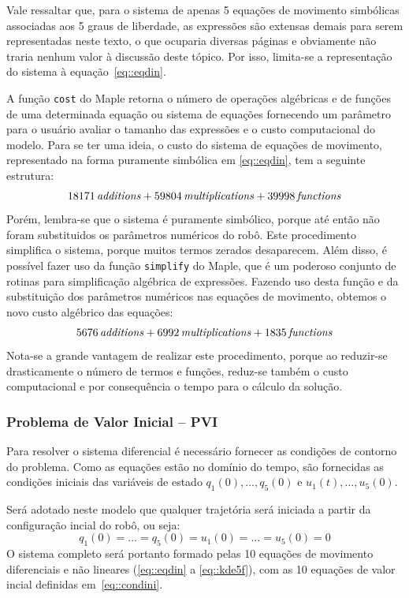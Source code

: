 Vale ressaltar que, para o sistema de apenas 5 equações de movimento simbólicas
associadas aos 5 graus de liberdade, as expressões são extensas demais para
serem representadas neste texto, o que ocuparia diversas páginas e obviamente
não traria nenhum valor à discussão deste tópico. Por isso, limita-se a
representação do sistema à equação~\ref{eq::eqdin}.

A função \texttt{cost} do Maple retorna o número de operações algébricas e de
funções de uma determinada equação ou sistema de equações fornecendo um
parâmetro para o usuário avaliar o tamanho das expressões e o custo
computacional do modelo.
Para se ter uma ideia, o custo do sistema de equações de movimento, representado
na forma puramente simbólica em \ref{eq::eqdin}, tem  a seguinte estrutura:
%
	$$ 18171\,{\it additions}+59804\,{\it multiplications}+39998\,{\it 
functions} $$
%
Porém, lembra-se que o sistema é puramente simbólico, porque até então não foram
substituidos os parâmetros numéricos do robô.
Este procedimento simplifica o sistema, porque muitos termos zerados
desaparecem.
Além disso, é possível fazer uso da função \texttt{simplify} do Maple, que é um
poderoso conjunto de rotinas para simplificação algébrica de expressões. Fazendo
uso desta função e da substituição dos parâmetros numéricos nas equações de
movimento, obtemos o novo custo algébrico das equações:
%
	$$ 5676\,{\it additions}+6992\,{\it multiplications}+1835\,{\it functions} $$
%
Nota-se a grande vantagem de realizar este procedimento, porque ao reduzir-se
drasticamente o número de termos e funções, reduz-se também o custo
computacional e por consequência o tempo para o cálculo da solução.

\subsubsection{Problema de Valor Inicial -- PVI}

Para resolver o sistema diferencial é necessário fornecer as condições de
contorno do problema. Como as equações estão no domínio do tempo, são fornecidas
as condições iniciais das variáveis de estado $q_{1}(0),\ldots, q_{5}(0)$ e
$u_{1}(t),\ldots, u_{5}(0)$.

Será adotado neste modelo que qualquer trajetória será iniciada a partir da
configuração incial do robô, ou seja:
%
\begin{equation}
	q_{1}(0) = \ldots = q_{5}(0) = u_{1}(0) = \ldots = u_{5}(0) = 0
	\label{eq::condini}
\end{equation}
%
O sistema completo será portanto formado pelas 10 equações de movimento
diferenciais e não lineares (\ref{eq::eqdin} a \ref{eq::kde5f}), com as 10
equações de valor incial definidas em~\ref{eq::condini}.

